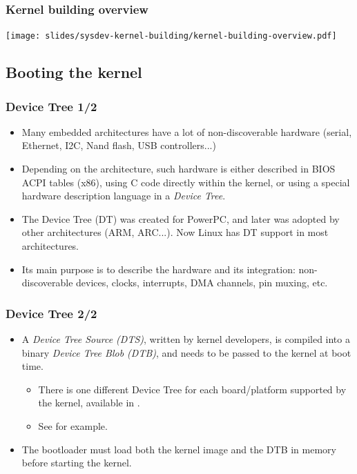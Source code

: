\begin{frame}
  \frametitle{Kernel building overview}
  \begin{center}
    \texttt{[image: slides/sysdev-kernel-building/kernel-building-overview.pdf]}
  \end{center}
\end{frame}

\subsection{Booting the kernel}

\begin{frame}
  \frametitle{Device Tree 1/2}
  \begin{itemize}
  \item Many embedded architectures have a lot of non-discoverable
    hardware (serial, Ethernet, I2C, Nand flash, USB  controllers...)
  \item Depending on the architecture, such hardware is either
    described in BIOS ACPI tables (x86), using C code directly within the kernel,
    or using a special hardware description language in a {\em Device Tree}.
  \item The Device Tree (DT) was created for PowerPC, and later was
    adopted by other architectures (ARM, ARC...). Now Linux
    has DT support in most architectures.
  \item Its main purpose is to describe the hardware and its integration:
    non-discoverable devices, clocks, interrupts, DMA channels, pin
    muxing, etc.
  \end{itemize}
\end{frame}

\begin{frame}
  \frametitle{Device Tree 2/2}
  \begin{itemize}
  \item A {\em Device Tree Source (DTS)}, written by kernel developers,
    is compiled into a binary {\em Device Tree Blob (DTB)}, and needs to
    be passed to the kernel at boot time.
    \begin{itemize}
    \item There is one different Device Tree for each board/platform
      supported by the kernel, available in
      .
     \item See  for
      example.
    \end{itemize}
  \item The bootloader must load both the kernel image and the DTB
    in memory before starting the kernel.
  \end{itemize}
\end{frame}


